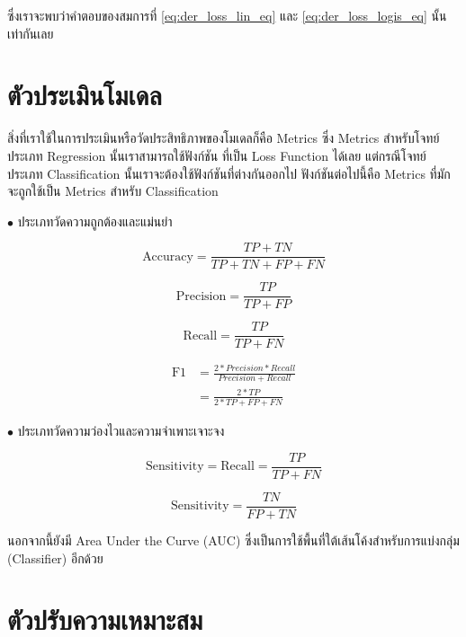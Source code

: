 \noindent ซึ่งเราจะพบว่าคำตอบของสมการที่ \ref{eq:der_loss_lin_eq} และ \ref{eq:der_loss_logis_eq} นั้นเท่ากันเลย

\section{ตัวประเมินโมเดล}
\label{sec:metrics}

สิ่งที่เราใช้ในการประเมินหรือวัดประสิทธิภาพของโมเดลก็คือ Metrics ซึ่ง Metrics สำหรับโจทย์ประเภท Regression นั้นเราสามารถใช้ฟังก์ชัน%
ที่เป็น Loss Function ได้เลย แต่กรณีโจทย์ประเภท Classification นั้นเราจะต้องใช้ฟังก์ชันที่ต่างกันออกไป ฟังก์ชันต่อไปนี้คือ Metrics 
ที่มักจะถูกใช้เป็น Metrics สำหรับ Classification

\noindent $\bullet$ ประเภทวัดความถูกต้องและแม่นยำ

\begin{equation}
    \text{Accuracy} = \frac{TP+TN}{TP+TN+FP+FN}
\end{equation}

\begin{equation}
    \text{Precision} = \frac{TP}{TP+FP}
\end{equation}

\begin{equation}
    \text{Recall} = \frac{TP}{TP+FN}
\end{equation}

\begin{align}
    \text{F1} &= \frac{2*Precision*Recall}{Precision+Recall} \nonumber \\
    &= \frac{2*TP}{2*TP+FP+FN}
\end{align}

\noindent $\bullet$ ประเภทวัดความว่องไวและความจำเพาะเจาะจง

\begin{equation}
    \text{Sensitivity} = \text{Recall} = \frac{TP}{TP+FN}
\end{equation}

\begin{equation}
    \text{Sensitivity} = \frac{TN}{FP+TN}
\end{equation}

\noindent นอกจากนี้ยังมี Area Under the Curve (AUC) ซึ่งเป็นการใช้พื้นที่ใต้เส้นโค้งสำหรับการแบ่งกลุ่ม (Classifier) อีกด้วย

\section{ตัวปรับความเหมาะสม}
\label{sec:optimizer}

